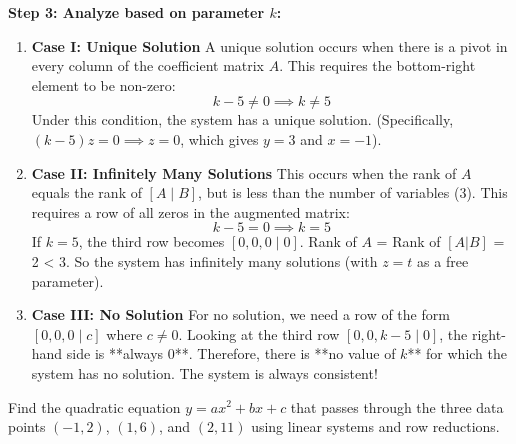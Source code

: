 \documentclass[11pt,a4paper]{article}
\begin{document}
\begin{solutionbox}
\textbf{Step 3: Analyze based on parameter $k$:}
\begin{enumerate}
    \item \textbf{Case I: Unique Solution}
          A unique solution occurs when there is a pivot in every column of the coefficient matrix $A$. This requires the bottom-right element to be non-zero:
          \[ k - 5 \neq 0 \implies k \neq 5 \]
          Under this condition, the system has a unique solution. (Specifically, $(k-5)z = 0 \implies z = 0$, which gives $y = 3$ and $x = -1$).
    \item \textbf{Case II: Infinitely Many Solutions}
          This occurs when the rank of $A$ equals the rank of $[A \mid B]$, but is less than the number of variables (3). 
          This requires a row of all zeros in the augmented matrix:
          \[ k - 5 = 0 \implies k = 5 \]
          If $k = 5$, the third row becomes $[0, 0, 0 \mid 0]$. Rank of $A$ = Rank of $[A|B]$ = 2 < 3. 
          So the system has infinitely many solutions (with $z = t$ as a free parameter).
    \item \textbf{Case III: No Solution}
          For no solution, we need a row of the form $[0, 0, 0 \mid c]$ where $c \neq 0$.
          Looking at the third row $[0, 0, k-5 \mid 0]$, the right-hand side is **always 0**.
          Therefore, there is **no value of $k$** for which the system has no solution. The system is always consistent!
\end{enumerate}
\end{solutionbox}

\vspace{0.8cm}

\begin{questionbox}
Find the quadratic equation $y = ax^2 + bx + c$ that passes through the three data points $(-1, 2)$, $(1, 6)$, and $(2, 11)$ using linear systems and row reductions.
\end{questionbox}
\end{document}
